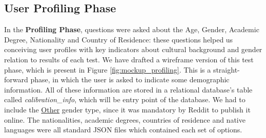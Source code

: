 \subsection{User Profiling Phase}
\label{subsec:design_profiling}
%
In the \textbf{Profiling Phase}, questions were asked about the Age, Gender, Academic Degree, Nationality and Country of Residence: these
questions helped us conceiving user profiles with key indicators about cultural background and gender relation to results of each test.
%
We have drafted a wireframe version of this test phase, which is present in Figure \ref{fig:mockup_profiling}. This is a straight-forward
phase, in which the user is asked to indicate some demographic information. All of these information are stored in a relational database's
table called \emph{calibration\_info}, which will be entry point of the database. We had to include the \ul{Other} gender type, since it was
mandatory by Reddit to publish it online. The nationalities, academic degrees, countries of residence and native languages were all standard
JSON files which contained each set of options. \par
%
